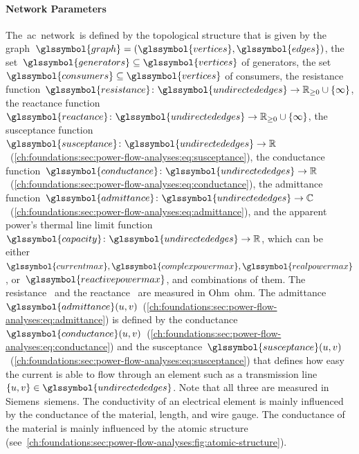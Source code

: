 \paragraph{Network Parameters}
\label{ch:foundations:network-parameters}
% 
% 
The~\gls{ac}~network~\acnetworktuple is defined by the topological structure
that is given by the graph~$\glssymbol{graph} = (\glssymbol{vertices},
\glssymbol{edges})$,
the set~$\glssymbol{generators}\subseteq\glssymbol{vertices}$ of generators, the
set~$\glssymbol{consumers}\subseteq\glssymbol{vertices}$ of consumers,
% 
the resistance function~$\glssymbol{resistance}\colon
\glssymbol{undirectededges}\to\posreals\cup
\{\infty\}$,
% 
the reactance
function~$\glssymbol{reactance}\colon\glssymbol{undirectededges}\to\posreals\cup
\{\infty\}$,
% 
the susceptance
function~$\glssymbol{susceptance}\colon\glssymbol{undirectededges}\to\reals$~(\cref{ch:foundations:sec:power-flow-analyses:eq:susceptance}),
% 
the conductance function~$\glssymbol{conductance}\colon
\glssymbol{undirectededges}\to\reals$~(\cref{ch:foundations:sec:power-flow-analyses:eq:conductance}),
% 
the admittance
function~$\glssymbol{admittance}\colon\glssymbol{undirectededges}\to\complexes$~(\cref{ch:foundations:sec:power-flow-analyses:eq:admittance}),
% 
and the apparent power's thermal line limit
function~$\glssymbol{capacity}\colon\glssymbol{undirectededges}\to\reals$, which
can be either~$\glssymbol{currentmax}, \glssymbol{complexpowermax},
\glssymbol{realpowermax}$, or~$\glssymbol{reactivepowermax}$, and combinations
of them. The resistance~ and the
reactance~ are measured in Ohm~\gls{ohm}. The
admittance~$\glssymbol{admittance}(\vertexa,\vertexb)$~(\cref{ch:foundations:sec:power-flow-analyses:eq:admittance})
is defined by the
conductance~$\glssymbol{conductance}(\vertexa,\vertexb)$~(\cref{ch:foundations:sec:power-flow-analyses:eq:conductance})
and the
susceptance~$\glssymbol{susceptance}(\vertexa,\vertexb)$~(\cref{ch:foundations:sec:power-flow-analyses:eq:susceptance})
that defines how easy the current is able to flow through an element such as a
transmission line~$\{\vertexa,\vertexb\}\in\glssymbol{undirectededges}$. Note
that all three are measured in Siemens~\gls{siemens}. The conductivity of an
electrical element is mainly influenced by the conductance of the material,
length, and wire gauge. The conductance of the material is mainly influenced by
the atomic structure
(see~\cref{ch:foundations:sec:power-flow-analyses:fig:atomic-structure}).
